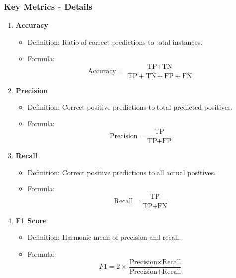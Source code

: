 \documentclass{beamer}
\begin{document}
\begin{frame}[fragile]
    \frametitle{Key Metrics - Details}
    \begin{enumerate}
        \item \textbf{Accuracy}
            \begin{itemize}
                \item Definition: Ratio of correct predictions to total instances.
                \item Formula: 
                \[
                \text{Accuracy} = \frac{\text{TP} + \text{TN}}{\text{TP} + \text{TN} + \text{FP} + \text{FN}}
                \]
            \end{itemize}
        \item \textbf{Precision}
            \begin{itemize}
                \item Definition: Correct positive predictions to total predicted positives.
                \item Formula: 
                \[
                \text{Precision} = \frac{\text{TP}}{\text{TP} + \text{FP}}
                \]
            \end{itemize}
        \item \textbf{Recall}
            \begin{itemize}
                \item Definition: Correct positive predictions to all actual positives.
                \item Formula: 
                \[
                \text{Recall} = \frac{\text{TP}}{\text{TP} + \text{FN}}
                \]
            \end{itemize}
        \item \textbf{F1 Score}
            \begin{itemize}
                \item Definition: Harmonic mean of precision and recall.
                \item Formula: 
                \[
                F1 = 2 \times \frac{\text{Precision} \times \text{Recall}}{\text{Precision} + \text{Recall}}
                \]
            \end{itemize}
    \end{enumerate}
\end{frame}
\end{document}
